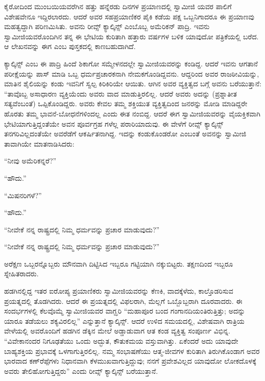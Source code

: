 ಕೈರೋದಿಂದ ಮುಂಬಯಿಯವರೆಗಿನ ಹತ್ತು ಹನ್ನೆರಡು ದಿನಗಳ ಪ್ರಯಾಣದಲ್ಲಿ ಸ್ವಾಮೀಜಿ ಯವರ ಪಾಲಿಗೆ ವಿಶೇಷವೇನೂ ಇದ್ದಿರಲಾರದು. ಆದರೆ ಅವರ ಸಹಪ್ರಯಾಣಿಕರ ಪೈಕಿ ಕಡೆಯ ಪಕ್ಷ ಒಬ್ಬನಿಗಾದರೂ ಈ ಪ್ರಯಾಣವು ಮಹತ್ವದ್ದಾಗಿ ಪರಿಣಮಿಸಿತು. ಅವನು ರೀವ್ಸ್ ಕ್ಯಾಲ್ಕಿನ್ಸ್ ಎಂಬೊಬ್ಬ ಅಮೆರಿಕನ್ ಪಾದ್ರಿ. ಇವನು ಸ್ವಾಮೀಜಿಯವರೊಂದಿಗಿನ ತನ್ನ ಈ ಭೇಟಿಯ ಕುರಿತಾಗಿ ಹತ್ತಾರು ವರ್ಷಗಳ ಬಳಿಕ ಯಾವುದೋ ಪತ್ರಿಕೆಯಲ್ಲಿ ಬರೆದ. ಆ ಲೇಖನವನ್ನು ಈಗ  ಎಂಬ ಪುಸ್ತಕದಲ್ಲಿ ಕಾಣಬಹುದಾಗಿದೆ.

ಕ್ಯಾಲ್ಕಿನ್ಸ್ ಎಂಬ ಈ ಪಾದ್ರಿ ಹಿಂದೆ ಶಿಕಾಗೋ ಸಮ್ಮೇಳನದಲ್ಲೇ ಸ್ವಾಮೀಜಿಯವರನ್ನು ಕಂಡಿದ್ದ. ಆದರೆ ಇವನು ಆಗತಾನೆ ಪರೀಕ್ಷೆಯನ್ನು ಪಾಸ್ ಮಾಡಿ ಒಬ್ಬ ಧರ್ಮಪ್ರಚಾರಕನಾಗಿ ನೇಮಕಗೊಂಡಿದ್ದವನು. ಆದ್ದರಿಂದ ಅವರ ರಾಜಠೀವಿಯನ್ನು, ಮಾತಿನ ಶೈಲಿಯನ್ನು ಕಂಡು ಇವನಿಗೆ ಸ್ವಲ್ಪ ಕಿರಿಕಿರಿಯೇ ಆಯಿತು. ಆಗಿನ ಅವರ ವ್ಯಕ್ತಿತ್ವದ ಬಗ್ಗೆ ಅವನು ಬರೆಯುತ್ತಾನೆ: “ತಾವೊಬ್ಬ ಅಸಾಧಾರಣ ವ್ಯಕ್ತಿಯೆಂದು ಅವರು ವಾದ ಮಾಡುತ್ತಿರಲಿಲ್ಲ. ಆದರೆ ಅವರು ಅದನ್ನು (ಪ್ರಶ್ನಾತೀತ ಸತ್ಯವೆಂಬಂತೆ) ಒಪ್ಪಿಕೊಂಡಿದ್ದರು. ಅವರು ಕೇವಲ ತಮ್ಮ ಶಕ್ತಿಯುತ ವ್ಯಕ್ತಿತ್ವದಿಂದ ಜನರನ್ನು ಮೋಡಿ ಮಾಡಿದ್ದರೇ ಹೊರತು ತಮ್ಮ ಭಾವನೆ-ಬೋಧನೆಗಳಿಂದಲ್ಲ ಎಂದು ಈತ ನಂಬಿದ್ದ. ಆದರೆ ಈಗ ಸ್ವಾಮೀಜಿಯವರನ್ನು ವೈಯಕ್ತಿಕವಾಗಿ ಭೇಟಿಯಾಗುತ್ತಿದ್ದಂತೆಯೇ ಅವನ ಪೂರ್ವಗ್ರಹ ಗಳೆಲ್ಲ ಪರಾರಿಯಾದುವು. ಈ ವೇಳೆಗೆ ರೀವ್ಸ್ ಕ್ಯಾಲ್ಕಿನ್ಸ್ ತನಗರಿವಿಲ್ಲದಂತೆಯೇ ಅವರೆಡೆಗೆ ಆಕರ್ಷಿತನಾಗಿದ್ದ. ಇದನ್ನು ಕಂಡುಕೊಂಡರೋ ಎಂಬಂತೆ ಅವನನ್ನು ಸ್ವಾಮೀಜಿ ತಾವಾಗಿಯೇ ಮಾತನಾಡಿಸಿದರು:

“ನೀವು ಅಮೆರಿಕನ್ನರೆ?”

“ಹೌದು.”

“ಮಿಷನರಿಗಳೆ?”

“ಹೌದು.”

“ನೀವೇಕೆ ನನ್ನ ರಾಷ್ಟ್ರದಲ್ಲಿ ನಿಮ್ಮ ಧರ್ಮವನ್ನು ಪ್ರಚಾರ ಮಾಡುವುದು?”

“ನೀವೇಕೆ ನನ್ನ ರಾಷ್ಟ್ರದಲ್ಲಿ ನಿಮ್ಮ ಧರ್ಮವನ್ನು ಪ್ರಚಾರ ಮಾಡುವುದು?”

ಅರೆಕ್ಷಣ ಒಬ್ಬರನ್ನೊಬ್ಬರು ಮೌನವಾಗಿ ದಿಟ್ಟಿಸಿದ ಇಬ್ಬರೂ ಗಟ್ಟಿಯಾಗಿ ನಕ್ಕುಬಿಟ್ಟರು. ತಕ್ಷಣದಿಂದ ಇಬ್ಬರೂ ಸ್ನೇಹಿತರಾದರು.

ಹಡಗಿನಲ್ಲಿದ್ದ ಇತರ ಐರೋಪ್ಯ ಪ್ರಯಾಣಿಕರು ಸ್ವಾಮೀಜಿಯವರನ್ನು ಕೆಣಕಿ, ವಾದಕ್ಕೆಳೆದು, ಕಾಲ್ತೊಡರಿಸುವ ಪ್ರಯತ್ನದಲ್ಲಿ ತೊಡಗಿದರು. ಆದರೆ ಈ ಪ್ರಯತ್ನದಲ್ಲಿ ವಿಫಲರಾಗಿ, ಮೆಲ್ಲಗೆ ಒಬ್ಬೊಬ್ಬರಾಗಿ ದೂರವಾದರು. ಈ ಸಂದರ್ಭಗಳಲ್ಲಿ ಕೆಲವೊಮ್ಮೆ ಸ್ವಾಮೀಜಿಯವರ ವಾಗ್ಝರಿ “ಮಹಾಪೂರ ಬಂದ ಗಂಗಾನದಿಯಂತಿರುತ್ತಿತ್ತು; ಅದನ್ನು ಯಾರೂ ತಡೆಯಲು ಶಕ್ಯವಿರಲಿಲ್ಲ” ಎನ್ನುತ್ತಾನೆ ಕ್ಯಾಲ್ಕಿನ್ಸ್. ಆದರೆ ಉಳಿದ ಸಮಯದಲ್ಲಿ, ವಿಶೇಷವಾಗಿ ರಾತ್ರಿಯ ವೇಳೆಯಲ್ಲಿ ಅವರೊಂದಿಗೆ ಹಡಗಿನ ಡೆಕ್ಕಿನ ಮೇಲೆ ಅಡ್ಡಾಡುವಾಗ ಆತ ಕಂಡ ವ್ಯಕ್ತಿತ್ವ ಸಂಪೂರ್ಣ ವಿಭಿನ್ನ. “ವಿವೇಕಾನಂದರ ನಿಗೂಢತೆಯು ಒಂದು ಅದ್ಭುತ, ಕೌತುಕಮಯ ವಸ್ತುವಾಗಿತ್ತು. ಏಕೆಂದರೆ ಅದು ಯಾವುದೇ ಬಾಹ್ಯಶಕ್ತಿಯ ಪ್ರಭಾವಕ್ಕೆ ಒಳಗಾಗುತ್ತಿರಲಿಲ್ಲ. ನಮ್ಮ ಸಂಭಾಷಣೆಯು ಆತ್ಮ-ಜೀವಗಳ ಕುರಿತಾಗಿ ತಿರುಗಿಕೊಂಡಾಗ ಅವರ ಭಾರವಾದ ಕಣ್​ರೆಪ್ಪೆಗಳು ನಿಧಾನವಾಗಿ ಕೆಳಮುಖವಾಗುತ್ತಿದ್ದುವು; ನನಗೆ ಪ್ರವೇಶವಿಲ್ಲದ ಯಾವುದೋ ಲೋಕದೊಳಕ್ಕೆ ಅವರು ತೇಲಿಹೋಗುತ್ತಿದ್ದರು” ಎಂದು ರೀವ್ಸ್ ಕ್ಯಾಲ್ಕಿನ್ಸ್ ಬರೆಯುತ್ತಾನೆ.

